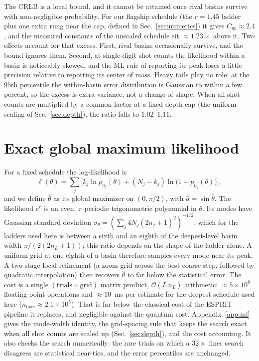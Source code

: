 \documentclass[%
 twocolumn,
 amsmath,amssymb,
prx,
longbibliography
]{revtex4-2}
\begin{document}
The \ac{CRLB} is a local bound, and it cannot be attained once rival basins survive with non-negligible probability. For our flagship schedule (the $r = 1.45$ ladder plus one extra rung near the cap, defined in Sec.~\ref{sec:numerics}) it gives $C_{95} \approx 2.4$, and the measured constants of the unscaled schedule sit $\approx 1.23\times$ above it. Two effects account for that excess. First, rival basins occasionally survive, and the bound ignores them. Second, at single-digit shot counts the likelihood within a basin is noticeably skewed, and the \ac{ML} rule of reporting its peak loses a little precision relative to reporting its center of mass. Heavy tails play no role: at the $95$th percentile the within-basin error distribution is Gaussian to within a few percent, so the excess is extra variance, not a change of shape. When all shot counts are multiplied by a common factor at a fixed depth cap (the uniform scaling of Sec.~\ref{sec:depth}), the ratio falls to $1.02$--$1.11$.

\section{Exact global maximum likelihood}\label{sec:ml}

For a fixed schedule the log-likelihood is
\begin{equation}\label{eq:loglik}
    \ell(\theta) = \sum_{j} \Big[ k_j \ln p_{n_j}(\theta) + (N_j - k_j)\ln\big(1 - p_{n_j}(\theta)\big) \Big],
\end{equation}
and we define $\hat\theta$ as its global maximizer on $(0, \pi/2)$, with $\hat a = \sin\hat\theta$. The likelihood $e^{\ell}$ is an even, $\pi$-periodic trigonometric polynomial in $\theta$. Its modes have Gaussian standard deviation $\sigma_\theta = (\sum_j 4N_j(2n_j+1)^2)^{-1/2}$, which for the ladders used here is between a sixth and an eighth of the deepest-level basin width $\pi/(2(2n_L+1))$; this ratio depends on the shape of the ladder alone. A uniform grid at one eighth of a basin therefore samples every mode near its peak. A two-stage local refinement (a zoom grid across the best coarse step, followed by quadratic interpolation) then recovers $\hat\theta$ to far below the statistical error. The cost is a single $(\text{trials} \times \text{grid})$ matrix product, $\mathcal{O}(L\, n_L)$ arithmetic: $\approx 5\times 10^{8}$ floating-point operations and $\approx 10$~ms per estimate for the deepest schedule used here ($n_{\max} \approx 2.1\times 10^5$). That is far below the classical cost of the ESPRIT pipeline it replaces, and negligible against the quantum cost. Appendix~\ref{app:ml} gives the mode-width identity, the grid-spacing rule that keeps the search exact when all shot counts are scaled up (Sec.~\ref{sec:depth}), and the cost accounting. It also checks the search numerically: the rare trials on which a $32\times$ finer search disagrees are statistical near-ties, and the error percentiles are unchanged.
\end{document}
